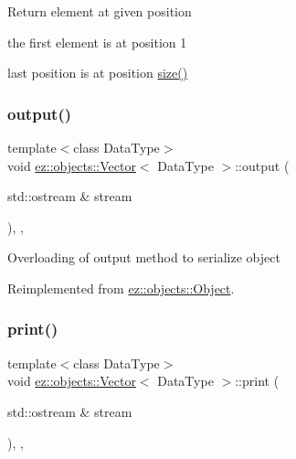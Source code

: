 Return element at given position 
\begin{DoxyItemize}
\item the first element is at position 1 
\item last position is at position \hyperlink{classez_1_1objects_1_1Vector_a0c9401b7eb53dc1bff3becb8d87e5a90}{size()} 
\end{DoxyItemize}\mbox{\label{classez_1_1objects_1_1Vector_a934bda76e5686f1af4a45dda39d75744}} 
\subsubsection{\texorpdfstring{output()}{output()}}
{\footnotesize\ttfamily template$<$class Data\+Type$>$ \\
void \hyperlink{classez_1_1objects_1_1Vector}{ez\+::objects\+::\+Vector}$<$ Data\+Type $>$\+::output (\begin{DoxyParamCaption}\item[{std\+::ostream \&}]{stream }\end{DoxyParamCaption})\hspace{0.3cm}{\ttfamily [inline]}, {\ttfamily [override]}, {\ttfamily [virtual]}}

Overloading of output method to serialize object 

Reimplemented from \hyperlink{classez_1_1objects_1_1Object_a0fdfe18e6c35d6b0d7e7a01265aded15}{ez\+::objects\+::\+Object}.

\mbox{\label{classez_1_1objects_1_1Vector_a1c548586b93d57a8fa99e38167442f37}} 
\subsubsection{\texorpdfstring{print()}{print()}}
{\footnotesize\ttfamily template$<$class Data\+Type$>$ \\
void \hyperlink{classez_1_1objects_1_1Vector}{ez\+::objects\+::\+Vector}$<$ Data\+Type $>$\+::print (\begin{DoxyParamCaption}\item[{std\+::ostream \&}]{stream }\end{DoxyParamCaption})\hspace{0.3cm}{\ttfamily [inline]}, {\ttfamily [override]}, {\ttfamily [virtual]}}

